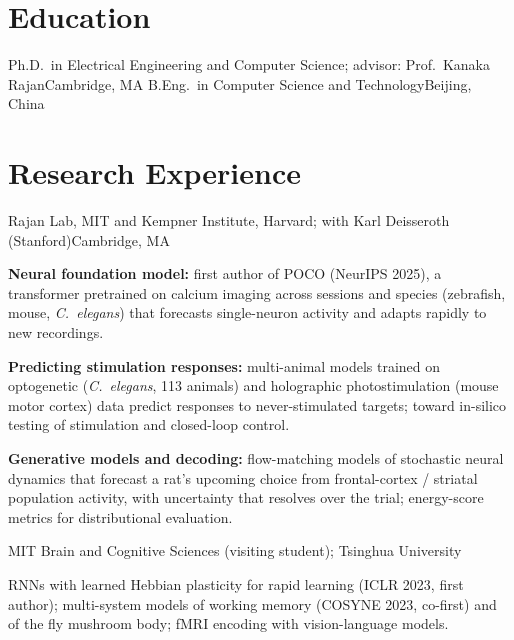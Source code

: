 \documentclass[resume]{clean_cv}
\author{Yu Duan}
\begin{document}
\maketitle
\resumecontact

\section{Education}
  {Ph.D.\ in Electrical Engineering and Computer Science; advisor: Prof.\ Kanaka Rajan}{Cambridge, MA}
\vspace{4pt}
  {B.Eng.\ in Computer Science and Technology}{Beijing, China}

\section{Research Experience}
  {Rajan Lab, MIT and Kempner Institute, Harvard; with Karl Deisseroth (Stanford)}{Cambridge, MA}
\begin{bullets}
\item \textbf{Neural foundation model:} first author of POCO (NeurIPS 2025), a transformer pretrained on calcium imaging across sessions and species (zebrafish, mouse, \textit{C.~elegans}) that forecasts single-neuron activity and adapts rapidly to new recordings.
\item \textbf{Predicting stimulation responses:} multi-animal models trained on optogenetic (\textit{C.~elegans}, 113 animals) and holographic photostimulation (mouse motor cortex) data predict responses to never-stimulated targets; toward in-silico testing of stimulation and closed-loop control.
\item \textbf{Generative models and decoding:} flow-matching models of stochastic neural dynamics that forecast a rat's upcoming choice from frontal-cortex / striatal population activity, with uncertainty that resolves over the trial; energy-score metrics for distributional evaluation.
\end{bullets}

  {MIT Brain and Cognitive Sciences (visiting student); Tsinghua University}{}
\begin{bullets}
\item RNNs with learned Hebbian plasticity for rapid learning (ICLR 2023, first author); multi-system models of working memory (COSYNE 2023, co-first) and of the fly mushroom body; fMRI encoding with vision-language models.
\end{bullets}
\end{document}
